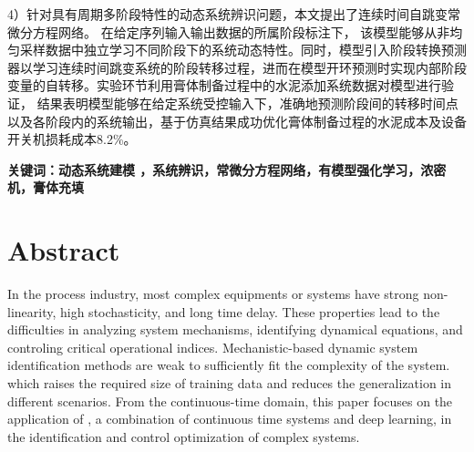 4）针对具有周期多阶段特性的动态系统辨识问题，本文提出了连续时间自跳变常微分方程网络。
在给定序列输入输出数据的所属阶段标注下，
该模型能够从非均匀采样数据中独立学习不同阶段下的系统动态特性。同时，模型引入阶段转换预测器以学习连续时间跳变系统的阶段转移过程，进而在模型开环预测时实现内部阶段变量的自转移。实验环节利用膏体制备过程中的水泥添加系统数据对模型进行验证，
结果表明模型能够在给定系统受控输入下，准确地预测阶段间的转移时间点以及各阶段内的系统输出，基于仿真结果成功优化膏体制备过程的水泥成本及设备开关机损耗成本8.2\%。


\vskip 30bp
{

    \textbf{ \heiti {} 关键词：动态系统建模 ，系统辨识，常微分方程网络，有模型强化学习，浓密机，膏体充填}
}



\chapter*{ Abstract }
In the process industry, most complex equipments or systems have strong non-linearity, high stochasticity, and long time delay.
These properties lead to the difficulties in analyzing system mechanisms, identifying dynamical equations, and controling critical operational indices. 
Mechanistic-based dynamic system identification methods are weak to sufficiently fit the complexity of the system.
which raises the required size of training data and reduces the generalization in different scenarios.
From the continuous-time domain, this paper focuses on the application of , a combination of continuous time systems and deep learning, in the identification and control optimization of complex systems.

